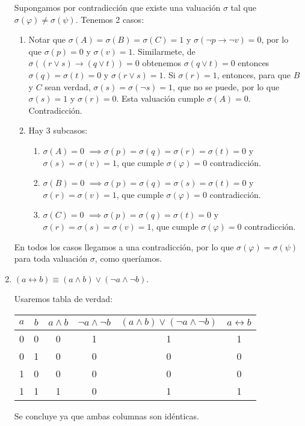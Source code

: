 \begin{enumerate}
    Supongamos por contradicción que existe una valuación $\sigma$ tal que $\sigma(\varphi)\neq \sigma(\psi)$. Tenemos 2 casos:
    \begin{enumerate}
        \item {} Notar que $\sigma(A)=\sigma(B)=\sigma(C)=1$ y $\sigma(\neg p \to \neg v)=0$, por lo que $\sigma(p)=0$ y $\sigma(v)=1$. Similarmete, de $\sigma((r\lor s)\to (q\lor t))=0$ obtenemos $\sigma(q\lor t)=0$ entonces $\sigma(q)=\sigma(t)=0$ y $\sigma(r\lor s)=1$. Si $\sigma(r)=1$, entonces, para que $B$ y $C$ sean verdad, $\sigma(s)=\sigma(\neg s)=1$, que no se puede, por lo que $\sigma(s)=1$ y $\sigma(r)=0$. Esta valuación cumple $\sigma(A)=0$. Contradicción.
        \item {} Hay 3 subcasos:
        \begin{enumerate}
            \item \underline{$\sigma(A)=0$} $\implies \sigma(p)=\sigma(q)=\sigma(r)=\sigma(t)=0$ y $\sigma(s)=\sigma(v)=1$, que cumple $\sigma(\varphi)=0$ contradicción. 
            \item \underline{$\sigma(B)=0$} $\implies \sigma(p)=\sigma(q)=\sigma(s)=\sigma(t)=0$ y $\sigma(r)=\sigma(v)=1$, que cumple $\sigma(\varphi)=0$ contradicción. 
            \item \underline{$\sigma(C)=0$} $\implies \sigma(p)=\sigma(q)=\sigma(t)=0$ y $\sigma(r)=\sigma(s)=\sigma(v)=1$, que cumple $\sigma(\varphi)=0$ contradicción. 
        \end{enumerate}
    \end{enumerate}
    En todos los casos llegamos a una contradicción, por lo que $\sigma(\varphi)=\sigma(\psi)$ para toda valuación $\sigma$, como queríamos.
\item \begin{claim} $(a \leftrightarrow b)\equiv (a \land b)\lor (\neg a \land \neg b)$.
\end{claim}
\begin{dem}
    Usaremos tabla de verdad: 
\bigskip
\begin{center}
\begin{tabular}{cccccc}
$a$ & $b$ & $a \land b$ & $\neg a \land \neg b$ & $(a \land b)\lor (\neg a \land \neg b)$ & $a \leftrightarrow b$\\
\midrule
0 & 0 & 0 & 1 & 1 & 1\\
0 & 1 & 0 & 0 & 0 & 0\\
1 & 0 & 0 & 0 & 0 & 0\\
1 & 1 & 1 & 0 & 1 & 1\\
\end{tabular}
\end{center}
Se concluye ya que ambas columnas son idénticas.
\end{dem}


\end{enumerate}
